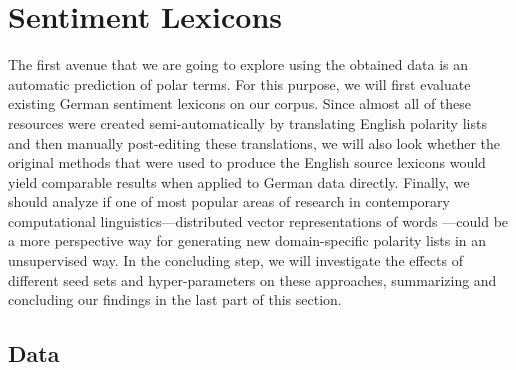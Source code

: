 

\chapter{Sentiment Lexicons}\label{sec:snt:lex}

The first avenue that we are going to explore using the obtained data
is an automatic prediction of polar terms.
For this purpose, we will first evaluate existing German sentiment
lexicons on our corpus.  Since almost all of these resources were
created semi-automatically by translating English polarity lists and
then manually post-editing these translations, we will also look
whether the original methods that were used to produce the English
source lexicons would yield comparable results when applied to German
data directly.  Finally, we should analyze if one of most popular
areas of research in contemporary computational
linguistics---distributed vector representations of words
\cite{Mikolov:13}---could be a more perspective way for generating new
domain-specific polarity lists in an unsupervised way.  In the
concluding step, we will investigate the effects of different seed
sets and hyper-parameters on these approaches, summarizing and
concluding our findings in the last part of this section.

\section{Data}\label{sec:snt-lex:data}

